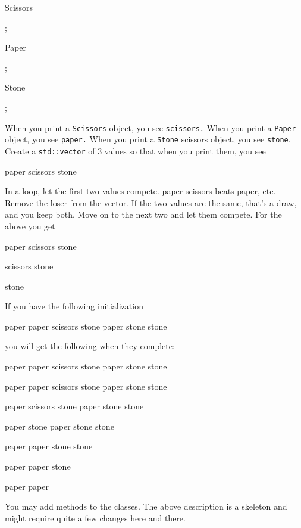 
\begin{console}

Scissors

{};

Paper

{};

Stone

{};

\end{console}



When you print a \verb!Scissors! object, you see \verb!scissors.! When you print a \verb!Paper! object, you see \verb!paper.! When you print a \verb!Stone! scissors object, you see \verb!stone!. Create a \verb!std::vector! of 3 values so that when you print them, you see



\begin{console}

paper scissors stone

\end{console}



In a loop, let the first two values compete. paper scissors beats paper, etc. Remove the loser from the vector. If the two values are the same, that's a draw, and you keep both. Move on to the next two and let them compete. For the above you get



\begin{console}

paper scissors stone

scissors stone

stone

\end{console}



If you have the following initialization



\begin{console}

paper paper scissors stone paper stone stone

\end{console}



you will get the following when they complete:



\begin{console}

paper paper scissors stone paper stone stone

paper paper scissors stone paper stone stone

paper scissors stone paper stone stone

paper stone paper stone stone

paper paper stone stone

paper paper stone

paper paper

\end{console}



You may add methods to the classes. The above description is a skeleton and might require quite a few changes here and there.

